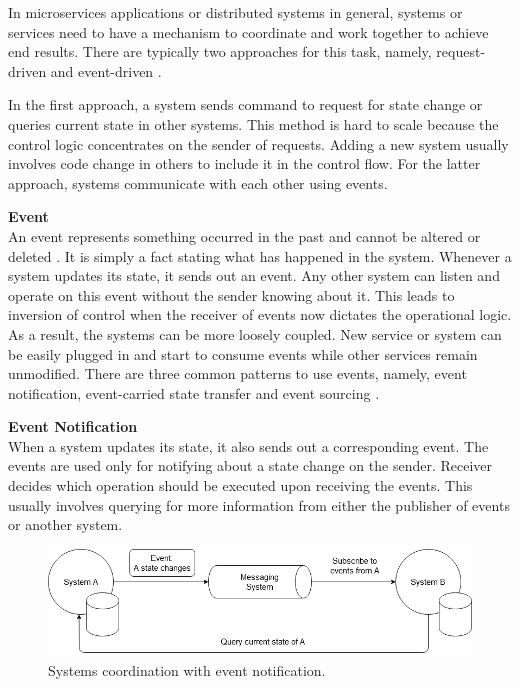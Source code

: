 In microservices applications or distributed systems in general, systems or services need to have a mechanism to coordinate and work together to achieve end results. There are typically two approaches for this task, namely, request-driven and event-driven \cite{stopford2018designingeventdriven}.

In the first approach, a system sends command to request for state change or queries current state in other systems. This method is hard to scale because the control logic concentrates on the sender of requests. Adding a new system usually involves code change in others to include it in the control flow. For the latter approach, systems communicate with each other using events.

\textbf{Event}\\
An event represents something occurred in the past and cannot be altered or deleted \cite{cqrsgregyoung}. It is simply a fact stating what has happened in the system. Whenever a system updates its state, it sends out an event. Any other system can listen and operate on this event without the sender knowing about it. This leads to inversion of control when the receiver of events now dictates the operational logic. As a result, the systems can be more loosely coupled. New service or system can be easily plugged in and start to consume events while other services remain unmodified. There are three common patterns to use events, namely, event notification, event-carried state transfer and event sourcing \cite{martinfowlereventdriven}.

\textbf{Event Notification}\\
When a system updates its state, it also sends out a corresponding event. The events are used only for notifying about a state change on the sender. Receiver decides which operation should be executed upon receiving the events. This usually involves querying for more information from either the publisher of events or another system.   
\begin{figure}[h]
	\centering
	\includegraphics[width=\linewidth]{images/eventnotification.png}
	\caption{Systems coordination with event notification.}
	\label{fig:eventnotification}
\end{figure}

